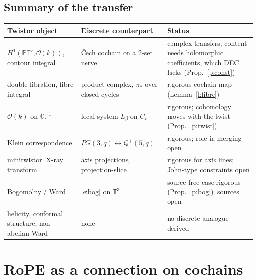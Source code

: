 \documentclass[10pt]{article}
\theoremstyle{definition}
\newcommand{\Tor}{\mathbb T}\newcommand{\PT}{\mathbb{PT}}\newcommand{\CP}{\mathbb{CP}}
\newcommand{\cO}{\mathcal O}\newcommand{\cH}{\mathcal H}
\begin{document}
\subsection{Summary of the transfer}
\begin{center}\small
\begin{tabular}{@{}p{4.2cm}p{5.2cm}p{5.6cm}@{}}\toprule
Twistor object & Discrete counterpart & Status\\\midrule
$H^1(\PT',\cO(k))$, contour integral & \v{C}ech cochain on a 2-set nerve & complex transfers; content needs holomorphic coefficients, which DEC lacks (Prop.~\ref{p:const})\\
double fibration, fibre integral & product complex, $\pi_*$ over closed cycles & rigorous cochain map (Lemma~\ref{l:fibre})\\
$\cO(k)$ on $\CP^1$ & local system $L_\beta$ on $C_r$ & rigorous; cohomology moves with the twist (Prop.~\ref{p:twist})\\
Klein correspondence & $PG(3,q)\leftrightarrow Q^+(5,q)$ & rigorous; role in merging open\\
minitwistor, X-ray transform & axis projections, projection-slice & rigorous for axis lines; John-type constraints open\\
Bogomolny / Ward & \eqref{e:bog} on $\Tor^3$ & source-free case rigorous (Prop.~\ref{p:bog}); sources open\\
helicity, conformal structure, non-abelian Ward & none & no discrete analogue derived\\\bottomrule
\end{tabular}\end{center}

\section{RoPE as a connection on cochains}\label{s:rope}
\end{document}

